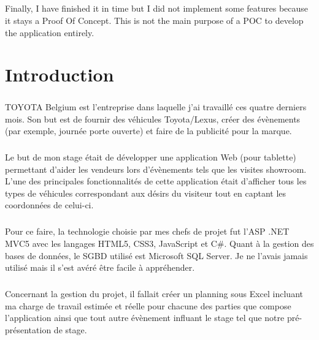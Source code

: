 \documentclass[12pt]{report}
\begin{document}
\paragraph{}
Finally, I have finished it in time but I did not implement some features because it stays a Proof Of Concept. 
This is not the main purpose of a POC to develop the application entirely.

\chapter{Introduction}

\paragraph{}
TOYOTA Belgium est l'entreprise dans laquelle j'ai travaillé ces quatre derniers mois.
Son but est de fournir des véhicules Toyota/Lexus, créer des évènements (par exemple, journée porte ouverte) et faire de la publicité pour la marque.

\paragraph{}
Le but de mon stage était de développer une application Web (pour tablette) permettant d'aider les vendeurs lors d'évènements tels que les visites showroom. L'une des principales fonctionnalités de cette application était d'afficher tous les types de véhicules correspondant aux désirs du visiteur tout en captant les coordonnées de celui-ci. 
 
\paragraph{}
Pour ce faire, la technologie choisie par mes chefs de projet fut l'ASP .NET MVC5 avec les langages HTML5, CSS3, JavaScript et C\#. Quant à la gestion des bases de données, le SGBD utilisé est Microsoft SQL Server. Je ne l'avais jamais utilisé mais il s'est avéré être facile à appréhender.

\paragraph{}
Concernant la gestion du projet, il fallait créer un planning sous Excel incluant ma charge de travail estimée et réelle pour chacune des parties que compose l’application ainsi que tout autre évènement influant le stage tel que notre pré-présentation de stage. 
\end{document}

